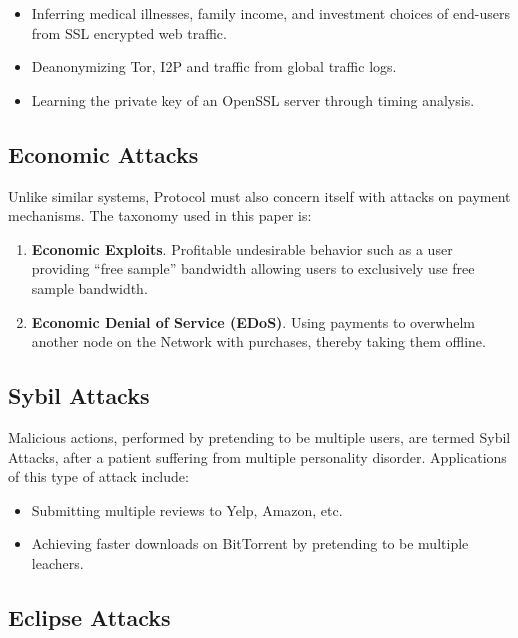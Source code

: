 \begin{itemize}
\item Inferring medical illnesses, family income, and investment choices of end-users from SSL encrypted web traffic\cite{broadInferenceAttacks}.
\item Deanonymizing Tor, I2P and \Orchid{} traffic from global traffic logs\cite{mixTrafficAnalysis}.
\item Learning the private key of an OpenSSL server through timing analysis\cite{opensslTimingAttack}.
\end{itemize}

\subsection*{Economic Attacks}
\label{econ-attacks}

Unlike similar systems, \Orchid{} Protocol must also concern itself with attacks on payment mechanisms. The taxonomy used in this paper is:

\begin{enumerate}
\item \textbf{Economic Exploits}. Profitable undesirable behavior such as a user providing “free sample” bandwidth allowing users to exclusively use free sample bandwidth.
\item \textbf{Economic Denial of Service (EDoS)}. Using payments to overwhelm another node on the \Orchid{} Network with purchases, thereby taking them offline.
\end{enumerate}

\subsection*{Sybil Attacks}

Malicious actions, performed by pretending to be multiple users, are termed Sybil Attacks, after a patient suffering from multiple personality disorder. Applications of this type of attack include:

\begin{itemize}
\item Submitting multiple reviews to Yelp, Amazon, etc.
\item Achieving faster downloads on BitTorrent by pretending to be multiple leachers\cite{freeridingBittorrent}.
\end{itemize}

\subsection*{Eclipse Attacks}

